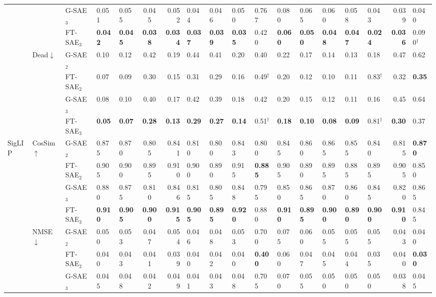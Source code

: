 \begin{table}[tbp]
{\begin{tabular}{lll A B C D E F G H I J K L M N O}
  & & G-SAE$_3$  & 0.051 & 0.055 & 0.045 & 0.052 & 0.044 & 0.046 & 0.050 & 0.767 & 0.080 & 0.065 & 0.060 & 0.058 & 0.043 & 0.039 & 0.040 \\
  & & FT-SAE$_3$ & \bf0.042 & \bf0.045 & \bf0.038 & \bf0.034 & \bf0.037 & \bf0.039 & \bf0.035 & 0.420 & \bf0.060 & \bf0.050 & \bf0.048 & \bf0.047 & \bf0.024 & \bf0.036 & 0.090$^\dagger$ \\
  \cmidrule(l){2-18}
  & Dead$\downarrow$
    & G-SAE$_2$  & 0.10 & 0.12 & 0.42 & 0.19 & 0.44 & 0.41 & 0.20 & 0.40 & 0.22 & 0.17 & 0.14 & 0.13 & 0.18 & 0.47 & 0.62 \\
  & & FT-SAE$_2$ & 0.07 & 0.09 & 0.30 & 0.15 & 0.31 & 0.29 & 0.16 & 0.49$^\dagger$ & 0.20 & 0.12 & 0.10 & 0.11 & 0.83$^\dagger$ & 0.32 & \bf0.35 \\
  & & G-SAE$_3$  & 0.08 & 0.10 & 0.40 & 0.17 & 0.42 & 0.39 & 0.18 & 0.42 & 0.20 & 0.15 & 0.12 & 0.11 & 0.16 & 0.45 & 0.64 \\
  & & FT-SAE$_3$ & \bf0.05 & \bf0.07 & \bf0.28 & \bf0.13 & \bf0.29 & \bf0.27 & \bf0.14 & 0.51$^\dagger$ & \bf0.18 & \bf0.10 & \bf0.08 & \bf0.09 & 0.81$^\dagger$ & \bf0.30 & 0.37 \\
\midrule
SigLIP
  & CosSim$\uparrow$
    & G-SAE$_2$  & 0.875 & 0.870 & 0.805 & 0.841 & 0.810 & 0.800 & 0.843 & 0.800 & 0.845 & 0.860 & 0.865 & 0.855 & 0.840 & 0.815 & \bf0.870 \\
  & & FT-SAE$_2$ & 0.905 & 0.900 & 0.895 & 0.910 & 0.900 & 0.890 & 0.915 & \bf0.885 & 0.905 & 0.890 & 0.895 & 0.885 & 0.895 & 0.905 & 0.850 \\
  & & G-SAE$_3$  & 0.880 & 0.875 & 0.810 & 0.846 & 0.815 & 0.805 & 0.848 & 0.795 & 0.850 & 0.865 & 0.870 & 0.860 & 0.845 & 0.820 & 0.865 \\
  & & FT-SAE$_3$ & \bf0.910 & \bf0.905 & \bf0.900 & \bf0.915 & \bf0.905 & \bf0.895 & \bf0.920 & 0.880 & \bf0.910 & \bf0.895 & \bf0.900 & \bf0.890 & \bf0.900 & \bf0.910 & 0.845 \\
  \cmidrule(l){2-18}
  & NMSE$\downarrow$
    & G-SAE$_2$  & 0.050 & 0.053 & 0.047 & 0.054 & 0.046 & 0.048 & 0.053 & 0.700 & 0.075 & 0.060 & 0.055 & 0.055 & 0.055 & 0.043 & 0.040 \\
  & & FT-SAE$_2$ & 0.040 & 0.043 & 0.041 & 0.039 & 0.040 & 0.042 & 0.040 & \bf0.400 & 0.060 & 0.047 & 0.045 & 0.044 & 0.035 & 0.040 & \bf0.030 \\
  & & G-SAE$_3$  & 0.045 & 0.048 & 0.042 & 0.049 & 0.041 & 0.043 & 0.048 & 0.705 & 0.070 & 0.055 & 0.050 & 0.050 & 0.050 & 0.038 & 0.045 \\

\end{tabular}}
\end{table}
